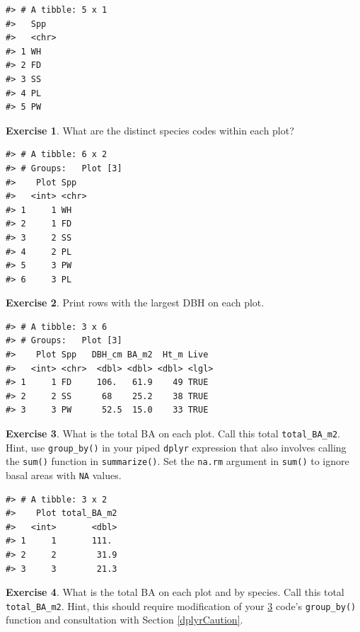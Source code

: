 \documentclass[
  11pt,
]{krantz}
\theoremstyle{definition}
\theoremstyle{definition}
\theoremstyle{definition}
\newtheorem{exercise}{Exercise}[chapter]
\theoremstyle{definition}
\theoremstyle{remark}
\begin{document}
\begin{verbatim}
#> # A tibble: 5 x 1
#>   Spp  
#>   <chr>
#> 1 WH   
#> 2 FD   
#> 3 SS   
#> 4 PL   
#> 5 PW
\end{verbatim}

\begin{exercise}
\protect\hypertarget{exr:dplyr17}{}\label{exr:dplyr17}What are the distinct species codes within each plot?
\end{exercise}

\begin{verbatim}
#> # A tibble: 6 x 2
#> # Groups:   Plot [3]
#>    Plot Spp  
#>   <int> <chr>
#> 1     1 WH   
#> 2     1 FD   
#> 3     2 SS   
#> 4     2 PL   
#> 5     3 PW   
#> 6     3 PL
\end{verbatim}

\begin{exercise}
\protect\hypertarget{exr:dplyr18}{}\label{exr:dplyr18}Print rows with the largest DBH on each plot.
\end{exercise}

\begin{verbatim}
#> # A tibble: 3 x 6
#> # Groups:   Plot [3]
#>    Plot Spp   DBH_cm BA_m2  Ht_m Live 
#>   <int> <chr>  <dbl> <dbl> <dbl> <lgl>
#> 1     1 FD     106.   61.9    49 TRUE 
#> 2     2 SS      68    25.2    38 TRUE 
#> 3     3 PW      52.5  15.0    33 TRUE
\end{verbatim}

\begin{exercise}
\protect\hypertarget{exr:dplyr19}{}\label{exr:dplyr19}What is the total BA on each plot. Call this total \texttt{total\_BA\_m2}. Hint, use \texttt{group\_by()} in your piped \texttt{dplyr} expression that also involves calling the \texttt{sum()} function in \texttt{summarize()}. Set the \texttt{na.rm} argument in \texttt{sum()} to ignore basal areas with \texttt{NA} values.
\end{exercise}

\begin{verbatim}
#> # A tibble: 3 x 2
#>    Plot total_BA_m2
#>   <int>       <dbl>
#> 1     1       111. 
#> 2     2        31.9
#> 3     3        21.3
\end{verbatim}

\begin{exercise}
\protect\hypertarget{exr:dplyr20}{}\label{exr:dplyr20}What is the total BA on each plot and by species. Call this total \texttt{total\_BA\_m2}. Hint, this should require modification of your \ref{exr:dplyr19} code's \texttt{group\_by()} function and consultation with Section \ref{dplyrCaution}.
\end{exercise}
\end{document}
